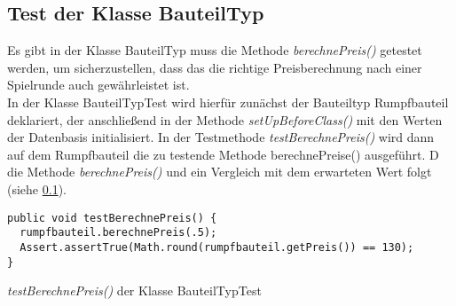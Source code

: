\subsection{Test der Klasse BauteilTyp}
\label{sub:junit-spiellogik-bauteiltyp}  


Es gibt in der Klasse BauteilTyp muss die Methode \textit{berechnePreis()} getestet werden, um sicherzustellen, dass das die richtige Preisberechnung nach einer Spielrunde auch gewährleistet ist.
\\
In der Klasse BauteilTypTest wird hierfür zunächst der Bauteiltyp Rumpfbauteil deklariert, der anschließend in der Methode \textit{setUpBeforeClass()} mit den Werten der Datenbasis initialisiert. In der Testmethode \textit{testBerechnePreis()} wird dann auf dem Rumpfbauteil die zu testende Methode berechnePreise() ausgeführt. D die Methode \textit{berechnePreis()} und ein Vergleich mit dem erwarteten Wert folgt (siehe \ref{sub:junit-spiellogik-bauteiltyp}).

\begin{programm}[htbp]
\begin{lstlisting}[breaklines=true]
public void testBerechnePreis() {
  rumpfbauteil.berechnePreis(.5);
  Assert.assertTrue(Math.round(rumpfbauteil.getPreis()) == 130);
}
\end{lstlisting}
\caption{\textit{testBerechnePreis()} der Klasse BauteilTypTest\label{sub:junit-spiellogik-bauteiltyp}}
\end{programm}
